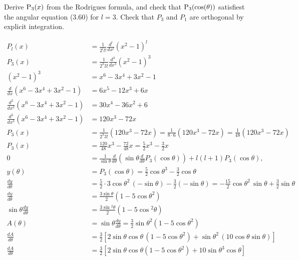 \begin{hwkProblem}{3.17}{}

	Derive \( \func{P_{3}}[x] \) from the Rodrigues formula, and check that \( \func{P_{3}}[\cos{\theta}] \) satisfiest the angular equation (3.60) for \( l=3 \). Check that \( P_{3} \) and \( P_{1} \) are orthogonal by explicit integration.

	\hwkSol{}

	\begin{align*}
		P_l(x) &= \frac{1}{2^l l!}\frac{d^l}{dx^l} (x^2-1)^l \\
		P_3(x) &= \frac{1}{2^3 3!}\frac{d^3}{dx^3} (x^2-1)^3 \\
		(x^2-1)^3 &= x^6 - 3x^4 + 3x^2 - 1 \\
		\frac{d}{dx}(x^6-3x^4+3x^2-1) &= 6x^5 - 12x^3 + 6x \\
		\frac{d^2}{dx^2}(x^6-3x^4+3x^2-1) &= 30x^4 - 36x^2 + 6 \\
		\frac{d^3}{dx^3}(x^6-3x^4+3x^2-1) &= 120x^3 - 72x \\
		P_3(x) &= \frac{1}{2^3 3!}(120x^3-72x) = \frac{1}{8\cdot6}(120x^3-72x)=\frac{1}{48}(120x^3-72x) \\
		P_3(x) &= \frac{120}{48}x^3 - \frac{72}{48}x = \frac{5}{2}x^3 - \frac{3}{2}x \\
		0 &= \frac{1}{\sin{\theta}}\frac{d}{d\theta}\left(\sin{\theta} \frac{d}{d\theta}P_3(\cos{\theta})\right) + l(l+1) P_3(\cos{\theta}), \\
		y(\theta) &= P_3(\cos{\theta})=\frac{5}{2}\cos{\theta}^3-\frac{3}{2}\cos{\theta} \\
		\frac{dy}{d\theta} &= \frac{5}{2}\cdot 3\cos{\theta}^2\,(-\sin{\theta}) - \frac{3}{2}(-\sin{\theta}) = -\frac{15}{2}\cos{\theta}^2\,\sin{\theta}+\frac{3}{2}\sin{\theta} \\
		\frac{dy}{d\theta} &= \frac{3\sin{\theta}}{2}\left(1-5\cos{\theta}^2\right) \\
		\sin{\theta}\frac{dy}{d\theta} &= \frac{3\sin{}^2\theta}{2}\left(1-5\cos{}^2\theta\right) \\
		A(\theta) &= \sin{\theta}\frac{dy}{d\theta} = \frac{3}{2}\sin{\theta}^2\left(1-5\cos{\theta}^2\right) \\
		\frac{dA}{d\theta} &= \frac{3}{2}\left[ 2\sin{\theta}\cos{\theta}\,(1-5\cos{\theta}^2) + \sin{\theta}^2\,(10\cos{\theta}\sin{\theta}) \right] \\
		\frac{dA}{d\theta} &= \frac{3}{2}\left[ 2\sin{\theta}\cos{\theta} (1-5\cos{\theta}^2) + 10\sin{\theta}^3\cos{\theta} \right] \\

\end{align*}
\end{hwkProblem}
